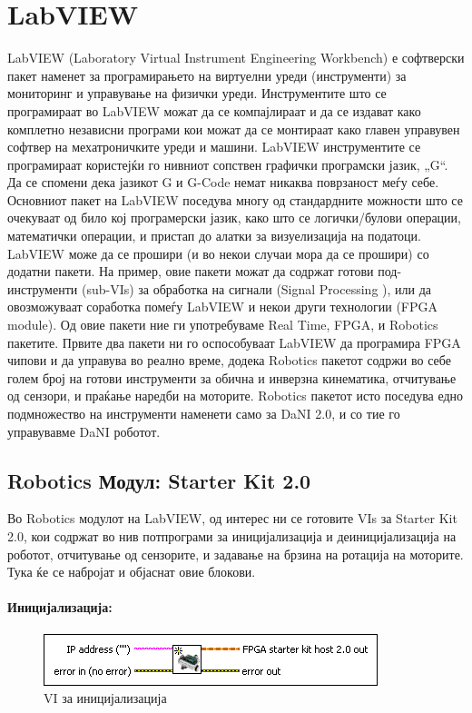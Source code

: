 \documentclass{article}
\begin{document}
\section{LabVIEW}
LabVIEW (Laboratory Virtual Instrument Engineering Workbench) е софтверски пакет наменет за програмирањето на виртуелни уреди (инструменти) за мониторинг и управување на физички уреди. Инструментите што се програмираат во LabVIEW можат да се компајлираат и да се издават како комплетно независни програми кои можат да се монтираат како главен управувен софтвер на мехатроничките уреди и машини.  LabVIEW инструментите се програмираат користејќи го нивниот сопствен графички програмски јазик, „G“. Да се спомени дека јазикот G и G-Code немат никаква поврзаност меѓу себе.
Основниот пакет на LabVIEW поседува многу од стандардните можности што се очекуваат од било кој програмерски јазик, како што се логички/булови операции, математички операции, и пристап до алатки за визуелизација на податоци. 
LabVIEW може да се прошири (и во некои случаи мора да се прошири) со додатни пакети. На пример, овие пакети можат да содржат готови под-инструменти (sub-VIs) за обработка на сигнали (Signal Processing ), или да овозможуваат соработка помеѓу LabVIEW и некои други технологии (FPGA module). Од овие пакети ние ги употребуваме Real Time, FPGA, и Robotics пакетите. Првите два пакети ни го оспособуваат LabVIEW да програмира FPGA чипови и да управува во реално време, додека Robotics пакетот содржи во себе голем број на готови инструменти за обична и инверзна кинематика, отчитување од сензори, и праќање наредби на моторите. 
Robotics пакетот исто поседува едно подмножество на инструменти наменети само за DaNI 2.0, и со тие го управувавме DaNI роботот.  
\subsection{Robotics Модул: Starter Kit 2.0}
Во Robotics модулот на LabVIEW, од интерес ни се готовите VIs за Starter Kit 2.0, кои содржат во нив потпрограми за иницијализација и деиницијализација на роботот, отчитување од сензорите, и задавање на брзина на ротација на моторите. Тука ќе се набројат и објаснат овие блокови.
\paragraph{Иницијализација:\\}

\begin{figure}[h]
\includegraphics[width=0.45\linewidth]{init.png} 
\raggedright
\caption{VI за иницијализација}
\label{fig:init.png}
\end{figure}
\end{document}
